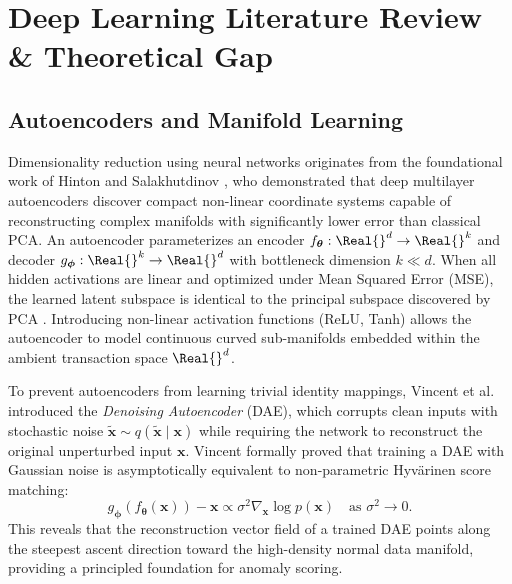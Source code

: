 
\section{Deep Learning Literature Review \& Theoretical Gap}
\label{sec:p2_dl_literature}

\subsection{Autoencoders and Manifold Learning}
Dimensionality reduction using neural networks originates from the foundational work of Hinton and Salakhutdinov \cite{hinton2006reducing}, who demonstrated that deep multilayer autoencoders discover compact non-linear coordinate systems capable of reconstructing complex manifolds with significantly lower error than classical PCA. An autoencoder parameterizes an encoder $f_{\boldsymbol{\theta}}: \Real{}^d \to \Real{}^k$ and decoder $g_{\boldsymbol{\phi}}: \Real{}^k \to \Real{}^d$ with bottleneck dimension $k \ll d$. When all hidden activations are linear and optimized under Mean Squared Error (MSE), the learned latent subspace is identical to the principal subspace discovered by PCA \cite{bourlard1988auto, baldi1989neural}. Introducing non-linear activation functions (ReLU, Tanh) allows the autoencoder to model continuous curved sub-manifolds embedded within the ambient transaction space $\Real{}^d$.

To prevent autoencoders from learning trivial identity mappings, Vincent et al. \cite{vincent2008extracting} introduced the \emph{Denoising Autoencoder} (DAE), which corrupts clean inputs with stochastic noise $\tilde{\mathbf{x}} \sim q(\tilde{\mathbf{x}} \mid \mathbf{x})$ while requiring the network to reconstruct the original unperturbed input $\mathbf{x}$. Vincent \cite{vincent2011connection} formally proved that training a DAE with Gaussian noise is asymptotically equivalent to non-parametric Hyv{\"a}rinen score matching:
\begin{equation}
    g_{\boldsymbol{\phi}}(f_{\boldsymbol{\theta}}(\mathbf{x})) - \mathbf{x} \propto \sigma^2 \nabla_{\mathbf{x}} \log p(\mathbf{x}) \quad \text{as } \sigma^2 \to 0.
\end{equation}
This reveals that the reconstruction vector field of a trained DAE points along the steepest ascent direction toward the high-density normal data manifold, providing a principled foundation for anomaly scoring.

